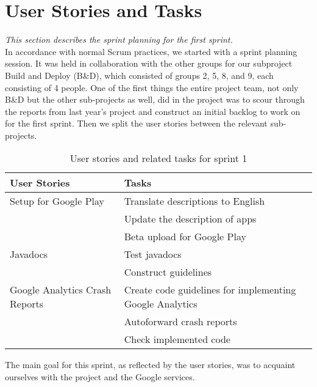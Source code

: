 \section{User Stories and Tasks} \label{Sprint1_SecUserStoriesAndTasks}
\textit{This section describes the sprint planning for the first sprint.}\\
In accordance with normal Scrum practices, we started with a sprint planning session. It was held in collaboration with the other groups for our subproject Build and Deploy (B\&D), which consisted of groups 2, 5, 8, and 9, each consisting of 4 people. One of the first things the entire project team, not only B\&D but the other sub-projects as well, did in the project was to scour through the reports from last year's project and construct an initial backlog to work on for the first sprint. Then we split the user stories between the relevant sub-projects.

\begin{table}[H]
	\centering
	\begin{tabular}{ll}
		\textbf{User Stories} & \textbf{Tasks}\\ \hline \noalign{\vskip 2mm}
		Setup for Google Play & Translate descriptions to English\\
		& Update the description of apps\\
		& Beta upload for Google Play\\ \hline
		Javadocs & Test javadocs\\
		& Construct guidelines\\ \hline
		Google Analytics Crash Reports & Create code guidelines for implementing Google Analytics\\
		& Autoforward crash reports\\
		& Check implemented code\\ \hline
	\end{tabular}
	\caption{User stories and related tasks for sprint 1}
	\label{UserStories_table}
\end{table}

The main goal for this sprint, as reflected by the user stories, was to acquaint ourselves with the project and the Google services.\\